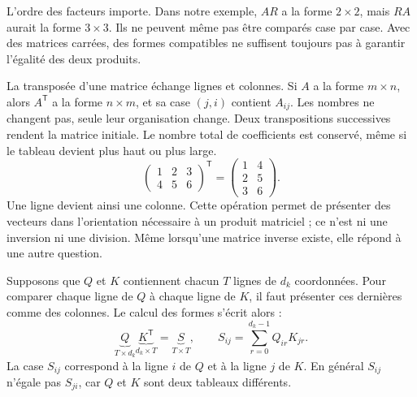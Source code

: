 L'ordre des facteurs importe. Dans notre exemple, \(AR\) a la
forme \(2\times2\), mais \(RA\) aurait la forme \(3\times3\).
Ils ne peuvent même pas être comparés case par case. Avec des
matrices carrées, des formes compatibles ne suffisent toujours
pas à garantir l'égalité des deux produits.



La transposée d'une matrice échange lignes et colonnes. Si \(A\)
a la forme \(m\times n\), alors \(A^{\mathsf T}\) a la forme
\(n\times m\), et sa case \((j,i)\) contient \(A_{ij}\).
Les nombres ne changent pas, seule leur organisation change.
Deux transpositions successives rendent la matrice initiale.
Le nombre total de coefficients est conservé, même si le tableau
devient plus haut ou plus large.
\[
 \begin{pmatrix}1&2&3\\4&5&6\end{pmatrix}^{\mathsf T}
 =\begin{pmatrix}1&4\\2&5\\3&6\end{pmatrix}.
\]
Une ligne devient ainsi une colonne. Cette opération permet de
présenter des vecteurs dans l'orientation nécessaire à un produit
matriciel ; ce n'est ni une inversion ni une division.
Même lorsqu'une matrice inverse existe, elle répond à une autre question.

Supposons que \(Q\) et \(K\) contiennent chacun \(T\) lignes de
\(d_k\) coordonnées. Pour comparer chaque ligne de \(Q\) à chaque
ligne de \(K\), il faut présenter ces dernières comme des colonnes.
Le calcul des formes s'écrit alors :
\[
 \underbrace{Q}_{T\times d_k}
 \underbrace{K^{\mathsf T}}_{d_k\times T}
 =\underbrace{S}_{T\times T},
 \qquad S_{ij}=\sum_{r=0}^{d_k-1}Q_{ir}K_{jr}.
\]
La case \(S_{ij}\) correspond à la ligne \(i\) de \(Q\) et à
la ligne \(j\) de \(K\). En général \(S_{ij}\) n'égale pas
\(S_{ji}\), car \(Q\) et \(K\) sont deux tableaux différents.


